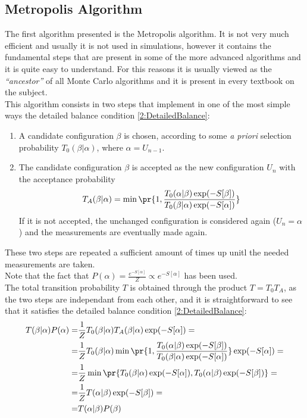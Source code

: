 \subsection{Metropolis Algorithm}
The first algorithm presented is the Metropolis algorithm. It is not very much efficient and usually it is not used in simulations, however it contains the fundamental steps that are present in some of the more advanced algorithms and it is quite easy to understand.
For this reasons it is usually viewed as the \emph{``ancestor''} of all Monte Carlo algorithms and it is present in every textbook on the subject.\\
This algorithm consists in two steps that implement in one of the most simple ways the detailed balance condition \eqref{2:DetailedBalance}:
\begin{enumerate}[label=\arabic*)]
    \item A candidate configuration $\beta$ is chosen, according to some \emph{a priori} selection probability $T_0(\beta|\alpha)$, where $\alpha=U_{n-1}$.
    \item The candidate configuration $\beta$ is accepted as the new configuration $U_n$ with the acceptance probability
          \begin{equation}
              T_A(\beta|\alpha) = \min\pr{1,\frac{T_0(\alpha|\beta)\exp(-S[\beta])}{T_0(\beta|\alpha)\exp(-S[\alpha])}} \label{2:MetropolisAccProb}
          \end{equation}
          If it is not accepted, the unchanged configuration is considered again ($U_n=\alpha$) and the measurements are eventually made again.
\end{enumerate}
These two steps are repeated a sufficient amount of times up unitl the needed measurements are taken.\\
Note that the fact that $P(\alpha) = \frac{e^{-S[\alpha]}}{Z} \varpropto e^{-S[\alpha]}$ has been used.\\
The total transition probability $T$ is obtained through the product $T=T_0T_A$, as the two steps are independant from each other, and it is straightforward to see that it satisfies the detailed balance condition \eqref{2:DetailedBalance}:
\begin{align*}
    T(\beta|\alpha)P(\alpha) =& \frac1Z T_0(\beta|\alpha)T_A(\beta|\alpha)\exp(-S[\alpha]) = \\
    =& \frac1Z T_0(\beta|\alpha)\min\pr{1,\frac{T_0(\alpha|\beta)\exp(-S[\beta])}{T_0(\beta|\alpha)\exp(-S[\alpha])}}\exp(-S[\alpha]) = \\
    =& \frac1Z \min\pr{T_0(\beta|\alpha)\exp(-S[\alpha]), T_0(\alpha|\beta)\exp(-S[\beta])} = \\
    =& \frac1Z T(\alpha|\beta)\exp(-S[\beta]) = \\
    =& T(\alpha|\beta)P(\beta)
\end{align*}

